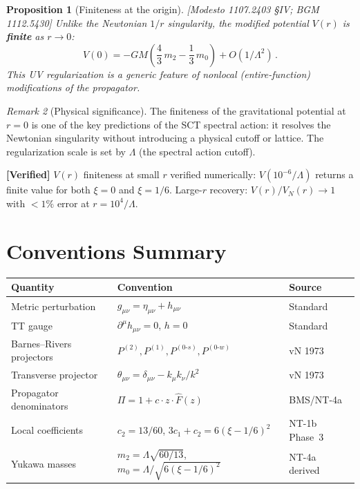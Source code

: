 \documentclass[12pt,a4paper]{article}
\newtheorem{proposition}{Proposition}[section]
\theoremstyle{definition}
\theoremstyle{remark}
\newtheorem{remark}[proposition]{Remark}
\newcommand{\fromlit}[1]{\textcolor{blue!70!black}{\textsf{[#1]}}}
\newcommand{\verified}[1]{%
  \par\smallskip\noindent
  \colorbox{green!10}{\parbox{\dimexpr\linewidth-2\fboxsep}{%
    \textcolor{green!50!black}{\textbf{[Verified]}} #1}}%
  \par\smallskip}
\begin{document}
\begin{proposition}[Finiteness at the origin]
\label{prop:finite-origin}
\fromlit{Modesto 1107.2403 \S IV; BGM 1112.5430}
Unlike the Newtonian $1/r$ singularity, the modified potential
$V(r)$ is \textbf{finite} as $r \to 0$:
\begin{equation}
  V(0) = -G M \left(\frac{4}{3}\,m_2 - \frac{1}{3}\,m_0\right)
  + O(1/\Lambda^2)\,.
  \label{eq:V-origin}
\end{equation}
This UV regularization is a generic feature of nonlocal
(entire-function) modifications of the propagator.
\end{proposition}

\begin{remark}[Physical significance]
The finiteness of the gravitational potential at $r=0$ is
one of the key predictions of the SCT spectral action:
it resolves the Newtonian singularity without introducing
a physical cutoff or lattice.  The regularization scale
is set by $\Lambda$ (the spectral action cutoff).
\end{remark}

\verified{$V(r)$ finiteness at small $r$ verified numerically:
$V(10^{-6}/\Lambda)$ returns a finite value for both
$\xi = 0$ and $\xi = 1/6$.  Large-$r$ recovery:
$V(r)/V_N(r) \to 1$ with $< 1\%$ error at $r = 10^4/\Lambda$.}


\section{Conventions Summary}
\label{sec:summary}

\begin{center}
\begin{tabular}{lll}
\toprule
Quantity & Convention & Source \\
\midrule
Metric perturbation & $g_{\mu\nu} = \eta_{\mu\nu}+h_{\mu\nu}$
  & Standard \\
TT gauge & $\partial^\mu h_{\mu\nu}=0$, $h=0$
  & Standard \\
Barnes--Rivers projectors & $P^{(2)}, P^{(1)}, P^{(0\text{-}s)},
  P^{(0\text{-}w)}$ & vN 1973 \\
Transverse projector & $\theta_{\mu\nu} = \delta_{\mu\nu} -
  k_\mu k_\nu/k^2$ & vN 1973 \\
Propagator denominators & $\Pi = 1 + c\cdot z\cdot\hat{F}(z)$
  & BMS/NT-4a \\
Local coefficients & $c_2 = 13/60$,
  $3c_1+c_2=6(\xi-1/6)^2$ & NT-1b Phase~3 \\
Yukawa masses & $m_2 = \Lambda\sqrt{60/13}$,
  $m_0 = \Lambda/\sqrt{6(\xi-1/6)^2}$ & NT-4a derived \\
\bottomrule
\end{tabular}
\end{center}
\end{document}
